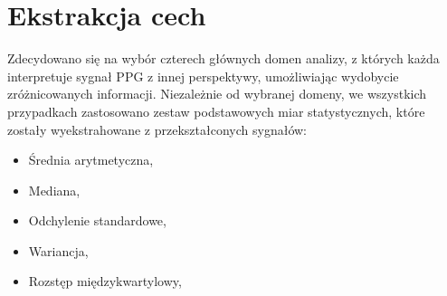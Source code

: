 \documentclass[a4paper,twoside,12pt]{book}
\begin{document}
\section{Ekstrakcja cech}
\label{Ekstrakcja cech}
Zdecydowano się na wybór czterech głównych domen analizy, z których każda interpretuje sygnał PPG z innej perspektywy, umożliwiając wydobycie zróżnicowanych informacji. Niezależnie od wybranej domeny, we wszystkich przypadkach zastosowano zestaw podstawowych miar statystycznych, które zostały wyekstrahowane z przekształconych sygnałów:
\begin{itemize}
	\item Średnia arytmetyczna,
	\item Mediana,
	\item Odchylenie standardowe,
	\item Wariancja,
	\item Rozstęp międzykwartylowy,
\end{itemize}
\end{document}
